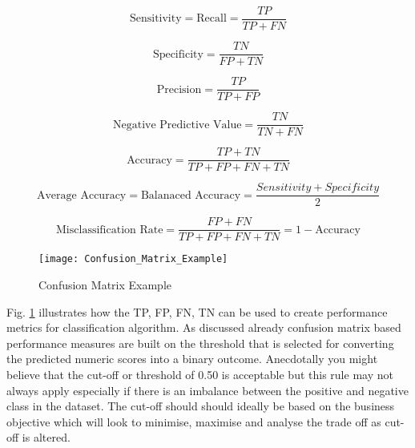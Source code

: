 \begin{equation} \label{eq:Sensitivity}
\text{Sensitivity} = \text{Recall} = \frac{TP}{TP + FN}
\end{equation}

\begin{equation} \label{eq:Specificity}
\text{Specificity} = \frac{TN}{FP + TN}
\end{equation}

\begin{equation} \label{eq:precision}
\text{Precision} = \frac{TP}{TP + FP}
\end{equation}

\begin{equation} \label{eq:npv}
\text{Negative Predictive Value} = \frac{TN}{TN + FN}
\end{equation}

\begin{equation} \label{eq:Accuracy}
\text{Accuracy} = \frac{TP + TN}{TP + FP + FN + TN}
\end{equation}

\begin{equation} \label{eq:Balanaced Accuracy}
\text{Average Accuracy} = \text{Balanaced Accuracy} = \frac{Sensitivity + Specificity}{2}
\end{equation}

\begin{equation} \label{eq:Misclassification Rate}
\text{Misclassification Rate} =  \frac{FP + FN}{TP + FP + FN + TN} = 1 - \text{Accuracy}
\end{equation}

\begin{figure}[H]
	\texttt{[image: Confusion\_Matrix\_Example]}
	\caption[Confusion Matrix Example]
	{Confusion Matrix Example}
	\label{fig:ConfusionMatrixExample}
\end{figure}

Fig. \ref{fig:ConfusionMatrixExample} illustrates how the TP, FP, FN, TN can be used to create performance metrics for classification algorithm. As discussed already confusion matrix based performance measures are built on the threshold that is selected for converting the predicted numeric scores into a binary outcome. Anecdotally you might believe that the cut-off or threshold of 0.50 is acceptable but this rule may not always apply especially if there is an imbalance between the positive and negative class in the dataset. The cut-off should should ideally be based on the business objective which will look to minimise, maximise and analyse the trade off as cut-off is altered. 

